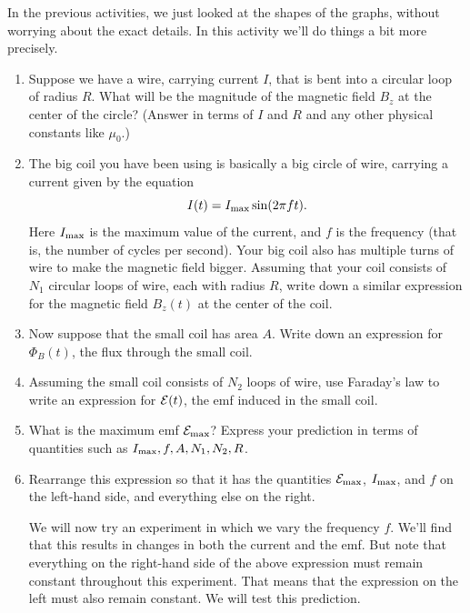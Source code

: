 In the previous activities, we just looked at the shapes of the graphs, without worrying
about the exact details.  In this activity we'll do things a bit more precisely.

\begin{enumerate}[labparts]
\item Suppose we have a wire, carrying current $I$, that is bent into a circular loop of radius $R$.  What will be the magnitude of the magnetic field $B_z$ at the center of the circle? (Answer in terms of $I$ and $R$ and any other physical constants like $\mu_0$.)
\answerspace{1.2in}

\item The big coil you have been using is basically a big circle of wire, carrying a current given by the equation
$$
I(t)=I_{\rm max}\sin(2\pi f t).
$$
Here $I_{\rm max}$ is the maximum value of the current, and
$f$ is the frequency (that is, the number of cycles per second).  
Your big coil also has multiple turns of wire to make the magnetic field bigger.
Assuming that your coil consists of $N_1$ circular loops of
wire, each with radius $R$, write down a similar expression for
the magnetic field $B_z(t)$ at the center of the coil.
\answerspace{0.8in}

\item Now suppose that the small coil has area $A$.  Write down an expression for $\Phi_B(t)$, the
flux through the small coil.
\answerspace{0.75in}

\item Assuming the small coil consists of $N_2$ loops of wire, use Faraday's law to write an expression 
for ${\cal E}(t)$, the emf induced in the small coil.
\answerspace{0.75in}

\item What is the maximum emf ${\cal E}_{\rm max}$?  Express your prediction
in terms of quantities such as $I_{\rm max},f,A,N_1,N_2,R$.
\answerspace{0.75in}

\item Rearrange this expression so that it has the quantities ${\cal E}_{\rm max}$,
$I_{\rm max}$, and $f$ on the left-hand side, and everything else on the right.
\answerspace{0.75in}


\pagebreak[3]
We will now try an experiment in which we vary the frequency $f$.  We'll
find that this results in changes in both the current and the emf.
But note that everything on the right-hand side of the above expression
must remain constant throughout this experiment.  That
means that the expression on the left must also remain
constant.  We will test this prediction.


\end{enumerate}
